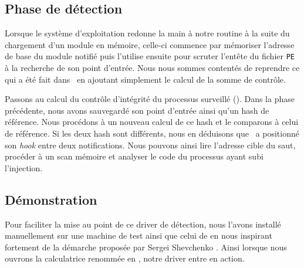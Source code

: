 %      
% 
% 


\subsection{Phase de détection}
Lorsque le système d'exploitation redonne la main à notre routine à la suite du chargement d'un module en mémoire, celle-ci commence par mémoriser l'adresse de base du module notifié puis l'utilise ensuite pour scruter l'entête du fichier \texttt{PE} à la recherche de son point d'entrée. Nous nous sommes contentés de reprendre ce qui a été fait dans \Duqu\ en ajoutant simplement le calcul de la somme de contrôle.

Passons au calcul du contrôle d'intégrité du processus surveillé (\service). Dans la phase précédente, nous avons sauvegardé son point d'entrée ainsi qu'un hash de référence. Nous procédons à un nouveau calcul de ce hash et le comparons à celui de référence. Si les deux hash sont différents, nous en déduisons que \Duqu\ a positionné son \emph{hook} entre deux notifications. Nous pouvons ainsi lire l'adresse cible du saut, procéder à un scan mémoire et analyser le code du processus ayant subi l'injection.    

\subsection{Démonstration}
Pour faciliter la mise au point de ce driver de détection, nous l'avons installé manuellement sur une machine de test ainsi que celui de \Duqu\space en nous inspirant fortement de la démarche proposée par Sergei Shevchenko \cite{FSabatier_SShevchenko}. Ainsi lorsque nous ouvrons la calculatrice renommée en \service , notre driver entre en action.

